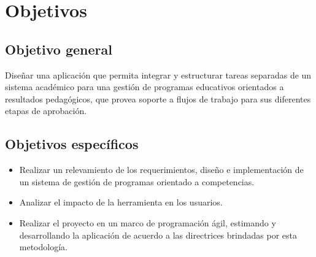 \section{Objetivos}
\subsection{Objetivo general}
Diseñar una aplicación que permita integrar y estructurar tareas separadas de un sistema académico para una gestión de programas educativos orientados a resultados pedagógicos, que provea soporte a flujos de trabajo para sus diferentes etapas de aprobación.


\subsection{Objetivos específicos}
  \begin{itemize}
    \item Realizar un relevamiento de los requerimientos, diseño e implementación de un sistema de gestión de programas orientado a competencias.
    \item Analizar el impacto de la herramienta en los usuarios.
    \item Realizar el proyecto en un marco de programación ágil, estimando y desarrollando la aplicación de acuerdo a las directrices brindadas por esta metodología\citep{stober_overview_2010}.
  \end{itemize}
